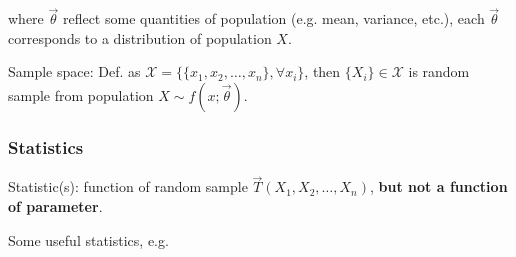    where  $\vec{\theta}$ reflect some quantities of population (e.g. mean, variance, etc.), each $\vec{\theta}$ corresponds to a distribution of population $X$.
    
    Sample space: Def. as $\mathscr{X}=\{\{x_1,x_2,\ldots,x_n\},\forall x_i\}$, then $\{X_i\}\in\mathscr{X}$ is random sample from population $X\sim f(x;\vec{\theta})$.

    
\subsubsection{Statistics}\label{SubSectionStatistics}
    Statistic(s): function of random sample $\vec{T}(X_1,X_2,\ldots,X_n)$, \textbf{but not a function of parameter}.
    
    Some useful statistics, e.g.
